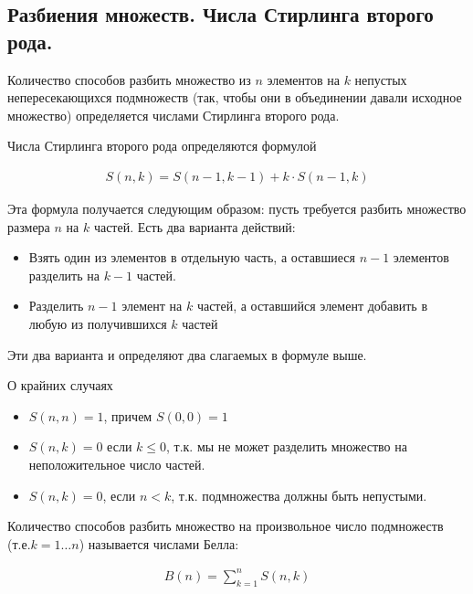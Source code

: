 \subsection{%
  Разбиения множеств. Числа Стирлинга второго рода.%
}

\begin{definition}
  Количество способов разбить множество из \(n\) элементов на \(k\) непустых
  непересекающихся подмножеств (так, чтобы они в объединении давали исходное
  множество) определяется числами Стирлинга второго рода.
\end{definition}

\begin{definition}
  Числа Стирлинга второго рода определяются формулой

  \begin{align*}
    S(n, k) = S(n - 1, k - 1) + k \cdot S(n - 1, k)
  \end{align*}
\end{definition}

Эта формула получается следующим образом: пусть требуется разбить множество
размера \(n\) на \(k\) частей. Есть два варианта действий:
\begin{itemize}
  \item Взять один из элементов в отдельную часть, а оставшиеся \(n - 1\)
  элементов разделить на \(k - 1\) частей.

  \item Разделить \(n - 1\) элемент на \(k\) частей, а оставшийся элемент
  добавить в любую из получившихся \(k\) частей
\end{itemize}
Эти два варианта и определяют два слагаемых в формуле выше.

\begin{remark}
  О крайних случаях

  \begin{itemize}
    \item \(S(n, n) = 1\), причем \(S(0, 0) = 1\)
    
    \item \(S(n, k) = 0\) если \(k \le 0\), т.к. мы не может разделить множество
    на неположительное число частей.

    \item \(S(n, k) = 0\), если \(n < k\), т.к. подмножества должны быть
    непустыми.
  \end{itemize}
\end{remark}

\begin{remark}
  Количество способов разбить множество на произвольное число подмножеств
  (т.е.\(k = 1 \dotsc n\)) называется числами Белла:

  \begin{align*}
    B(n) = \sum_{k = 1}^{n} S(n, k)
  \end{align*}
\end{remark}
